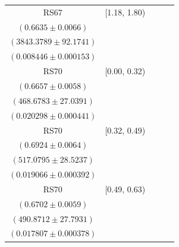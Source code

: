 {\begin{longtable}{|c|c|c|c|c|}
RS67 & [1.18, 1.80) & \begin{tabular}{@{}c@{}}$0.7129 \pm 0.0053$ \\ $(0.6635 \pm 0.0066)$\end{tabular} & \begin{tabular}{@{}c@{}}$3509.4895 \pm 85.0441$ \\ $(3843.3789 \pm 92.1741)$\end{tabular} & \begin{tabular}{@{}c@{}}$0.009213 \pm 0.000160$ \\ $(0.008446 \pm 0.000153)$\end{tabular} \\ \hline
\hline
RS70 & [0.00, 0.32) & \begin{tabular}{@{}c@{}}$0.7050 \pm 0.0061$ \\ $(0.6657 \pm 0.0058)$\end{tabular} & \begin{tabular}{@{}c@{}}$442.5388 \pm 25.5311$ \\ $(468.6783 \pm 27.0391)$\end{tabular} & \begin{tabular}{@{}c@{}}$0.018640 \pm 0.000566$ \\ $(0.020298 \pm 0.000441)$\end{tabular} \\ \hline
RS70 & [0.32, 0.49) & \begin{tabular}{@{}c@{}}$0.7218 \pm 0.0061$ \\ $(0.6924 \pm 0.0064)$\end{tabular} & \begin{tabular}{@{}c@{}}$495.9520 \pm 27.3583$ \\ $(517.0795 \pm 28.5237)$\end{tabular} & \begin{tabular}{@{}c@{}}$0.018456 \pm 0.000511$ \\ $(0.019066 \pm 0.000392)$\end{tabular} \\ \hline
RS70 & [0.49, 0.63) & \begin{tabular}{@{}c@{}}$0.7085 \pm 0.0060$ \\ $(0.6702 \pm 0.0059)$\end{tabular} & \begin{tabular}{@{}c@{}}$464.3488 \pm 26.2914$ \\ $(490.8712 \pm 27.7931)$\end{tabular} & \begin{tabular}{@{}c@{}}$0.017477 \pm 0.000496$ \\ $(0.017807 \pm 0.000378)$\end{tabular} \\ \hline

\end{longtable}}
